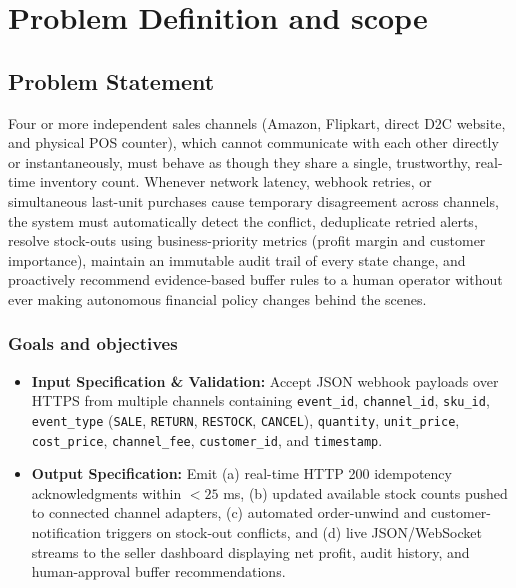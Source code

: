 \documentclass[oneside,a4paper,12pt]{report}
\begin{document}
\chapter{Problem Definition and scope}

\section{Problem Statement}
Four or more independent sales channels (Amazon, Flipkart, direct D2C website, and physical POS counter), which cannot communicate with each other directly or instantaneously, must behave as though they share a single, trustworthy, real-time inventory count. Whenever network latency, webhook retries, or simultaneous last-unit purchases cause temporary disagreement across channels, the system must automatically detect the conflict, deduplicate retried alerts, resolve stock-outs using business-priority metrics (profit margin and customer importance), maintain an immutable audit trail of every state change, and proactively recommend evidence-based buffer rules to a human operator without ever making autonomous financial policy changes behind the scenes.

\subsection{Goals and objectives}
\begin{itemize}
  \item \textbf{Input Specification \& Validation:} Accept JSON webhook payloads over HTTPS from multiple channels containing \texttt{event\_id}, \texttt{channel\_id}, \texttt{sku\_id}, \texttt{event\_type} (\texttt{SALE}, \texttt{RETURN}, \texttt{RESTOCK}, \texttt{CANCEL}), \texttt{quantity}, \texttt{unit\_price}, \texttt{cost\_price}, \texttt{channel\_fee}, \texttt{customer\_id}, and \texttt{timestamp}.
  \item \textbf{Output Specification:} Emit (a) real-time HTTP 200 idempotency acknowledgments within $<25$ ms, (b) updated available stock counts pushed to connected channel adapters, (c) automated order-unwind and customer-notification triggers on stock-out conflicts, and (d) live JSON/WebSocket streams to the seller dashboard displaying net profit, audit history, and human-approval buffer recommendations.
\end{itemize}
\end{document}
